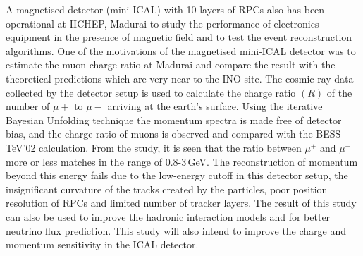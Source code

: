 A magnetised detector (mini-ICAL) with 10 layers of RPCs also has been
operational at IICHEP, Madurai to study the performance of electronics
equipment in the presence of magnetic field and to test the event
reconstruction algorithms. One of the motivations of the magnetised
mini-ICAL detector was to estimate the muon charge ratio at Madurai
and compare the result with the theoretical predictions which are very
near to the INO site.
The cosmic ray data collected by the detector setup is used to
calculate the charge ratio $(R)$ of the number of $\mu+$ to $\mu-$
arriving at the earth's surface. Using the iterative Bayesian
Unfolding technique the momentum spectra is made free of detector
bias, and the charge ratio of muons is observed and compared with the
BESS-TeV'02 calculation.
From the study, it is seen that the ratio between $\mu^{+}$ and
$\mu^{-}$ more or less matches in the range of 0.8-3\,GeV.
The reconstruction of momentum beyond this energy fails due to
the low-energy cutoff in this detector setup, the insignificant
curvature of the tracks created by the particles, poor position
resolution of RPCs and limited number of tracker layers. The result
of this study can also be used to improve the hadronic interaction
models and for better neutrino flux prediction. This study will
also intend to improve the charge and momentum sensitivity in the
ICAL detector.
